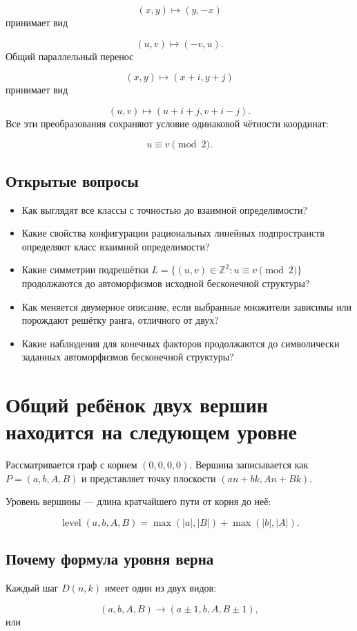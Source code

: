 $$(x,y)\mapsto(y,-x)$$
принимает вид

$$(u,v)\mapsto(-v,u).$$
Общий параллельный перенос

$$(x,y)\mapsto(x+i,y+j)$$
принимает вид

$$(u,v)\mapsto(u+i+j,v+i-j).$$
Все эти преобразования сохраняют условие одинаковой чётности координат:

$$u\equiv v\pmod2.$$
\subsection{Открытые вопросы}

\begin{itemize}
\tightlist
\item
  Как выглядят все классы с точностью до взаимной определимости?
\item
  Какие свойства конфигурации рациональных линейных подпространств определяют
  класс взаимной определимости?
\item
  Какие симметрии подрешётки
  $L=\{(u,v)\in\mathbb Z^2:u\equiv v\pmod2\}$ продолжаются до автоморфизмов
  исходной бесконечной структуры?
\item
  Как меняется двумерное описание, если выбранные множители зависимы или
  порождают решётку ранга, отличного от двух?
\item
  Какие наблюдения для конечных факторов продолжаются до символически заданных
  автоморфизмов бесконечной структуры?
\end{itemize}

\section{Общий ребёнок двух вершин находится на следующем уровне}

Рассматривается граф с корнем $(0,0,0,0)$. Вершина записывается как
$P = (a,b,A,B)$ и представляет точку плоскости
$(an + bk, An + Bk)$.

Уровень вершины --- длина кратчайшего пути от корня до неё:

$$
\operatorname{level}(a,b,A,B) = \max(|a|,|B|) + \max(|b|,|A|).
$$

\subsection{Почему формула уровня верна}

Каждый шаг $D(n,k)$ имеет один из двух видов:

$$(a,b,A,B)\to(a\pm1,b,A,B\pm1),
$$
или

